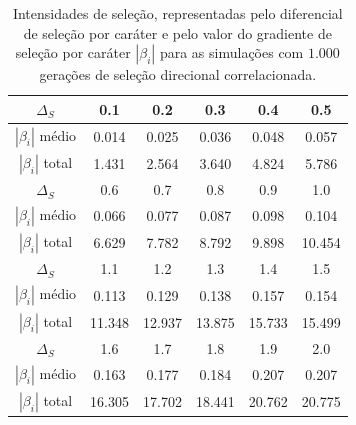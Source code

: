\begin{table}[htbp]
    \centering
    \caption{Intensidades de seleção, representadas pelo diferencial de
        seleção por caráter e pelo valor do gradiente de seleção por
        caráter $|\beta_i|$ para as simulações com $1.000$ gerações de
        seleção direcional correlacionada.}
    \label{tab:betasSS}
    \vspace{1em}
    \begin{tabular}{c|c|c|c|c|c}
        \toprule
        $\Delta_S$ & 0.1 & 0.2 & 0.3 & 0.4 & 0.5 \\
        \hline
        $|\beta_i|$ médio & 0.014 & 0.025 & 0.036 & 0.048 & 0.057 \\
         $|\beta_i|$ total & 1.431 & 2.564 & 3.640 & 4.824 & 5.786 \\ 
        \midrule
        \midrule
        $\Delta_S$ & 0.6 & 0.7 & 0.8 & 0.9 & 1.0 \\
        \hline
        $|\beta_i|$ médio & 0.066 & 0.077 & 0.087 & 0.098 & 0.104 \\
         $|\beta_i|$ total & 6.629 & 7.782 & 8.792 & 9.898 & 10.454 \\ 
        \midrule
        \midrule
        $\Delta_S$ & 1.1  & 1.2  & 1.3  & 1.4  & 1.5 \\ 
        \hline
        $|\beta_i|$ médio & 0.113 & 0.129 & 0.138 & 0.157 & 0.154 \\
         $|\beta_i|$ total & 11.348 & 12.937 & 13.875 & 15.733 & 15.499 \\ 
        \midrule
        \midrule
        $\Delta_S$ & 1.6  & 1.7  & 1.8  & 1.9  & 2.0 \\ 
        \hline
        $|\beta_i|$ médio & 0.163 & 0.177 & 0.184 & 0.207 & 0.207 \\
         $|\beta_i|$ total & 16.305 & 17.702 & 18.441 & 20.762 & 20.775 \\
        \bottomrule
    \end{tabular}
\end{table}

